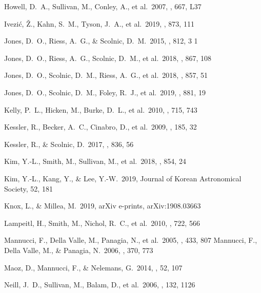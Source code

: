 \documentclass[]{aa} %
\begin{document}
\begin{thebibliography}{}
 Howell, D.~A., Sullivan, M., Conley, A., et al.\ 2007, \apjl, 667, L37


 Ivezi{\'c}, {\v{Z}}., Kahn, S.~M., Tyson, J.~A., et al.\ 2019, \apj, 873, 111


 Jones, D.~O., Riess, A.~G., \& Scolnic, D.~M.\ 2015, \apj, 812, 3
1

 Jones, D.~O., Riess, A.~G., Scolnic, D.~M., et al.\ 2018, \apj, 867, 108

 Jones, D.~O., Scolnic, D.~M., Riess, A.~G., et al.\ 2018, \apj, 857, 51

 Jones, D.~O., Scolnic, D.~M., Foley, R.~J., et al.\ 2019, \apj, 881, 19

 Kelly, P.~L., Hicken, M., Burke, D.~L., et al.\ 2010, \apj, 715, 743

 Kessler, R., Becker, A.~C., Cinabro, D., et al.\ 2009, \apjs, 185, 32

 Kessler, R., \& Scolnic, D.\ 2017, \apj, 836, 56

 Kim, Y.-L., Smith, M., Sullivan, M., et al.\ 2018, \apj, 854, 24

 Kim, Y.-L., Kang, Y., \& Lee, Y.-W.\ 2019, Journal of Korean Astronomical Society, 52, 181

 Knox, L., \& Millea, M.\ 2019, arXiv e-prints, arXiv:1908.03663

 Lampeitl, H., Smith, M., Nichol, R.~C., et al.\ 2010, \apj, 722, 566

 Mannucci, F.,
  Della Valle, M., Panagia, N., et al.\ 2005, \aap, 433, 807 
 Mannucci, F.,
  Della Valle, M., \& Panagia, N.\ 2006, \mnras, 370, 773 

 Maoz, D., Mannucci,
  F., \& Nelemans, G.\ 2014, \araa, 52, 107 


 Neill, J.~D., Sullivan, M., Balam, D., et al.\ 2006, \aj, 132, 1126


\end{thebibliography}
\end{document}
